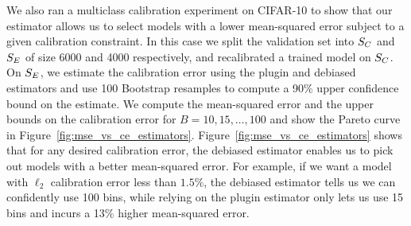 We also ran a multiclass calibration experiment on CIFAR-10 to show that our estimator allows us to select models with a lower mean-squared error subject to a given calibration constraint. In this case we split the validation set into $S_C{}$ and $S_E{}$ of size 6000 and 4000 respectively, and recalibrated a trained model on $S_C{}$. On $S_E{}$, we estimate the calibration error using the plugin and debiased estimators and use 100 Bootstrap resamples to compute a 90\% upper confidence bound on the estimate. We compute the mean-squared error and the upper bounds on the calibration error for $B = 10, 15, \dots, 100$ and show the Pareto curve in Figure~\ref{fig:mse_vs_ce_estimators}. Figure~\ref{fig:mse_vs_ce_estimators} shows that for any desired calibration error, the debiased estimator enables us to pick out models with a better mean-squared error. For example, if we want a model with $\ell_2$ calibration error less than $1.5\%$, the debiased estimator tells us we can confidently use 100 bins, while relying on the plugin estimator only lets us use 15 bins and incurs a 13\% higher mean-squared error.




